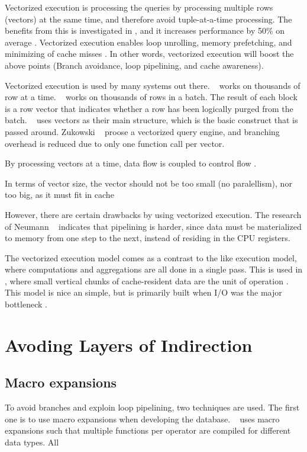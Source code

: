 Vectorized execution is processing the queries by processing multiple rows (vectors) at the same time, and therefore avoid tuple-at-a-time processing. The benefits from this is investigated in \cite{Abadi2008-dd}, and it increases performance by 50\% on average . Vectorized execution enables loop unrolling, memory prefetching, and minimizing of cache misses \cite{Larson2013-mc}. In other words, vectorized execution will boost the above points (Branch avoidance, loop pipelining, and cache awareness).

Vectorized execution is used by many systems out there. \ibm~\cite{Raman2013-em} works on thousands of row at a time. \mssql~\cite{Larson2013-mc} works on thousands of rows in a batch. The result of each block is a row vector that indicates whether a row has been logically purged from the batch. \monetx~\cite{Boncz2005-wj} uses vectors as their main structure, which is the basic construct that is passed around. Zukowski \ea~\cite{Zukowski2006-oz} proose a vectorized query engine, and branching overhead is reduced due to only one function call per vector.

By processing vectors at a time, data flow is coupled to control flow \cite{Stonebraker2005-qz, Lamb2012-kg}.

In terms of vector size, the vector should not be too small (no paralellism), nor too big, as it must fit in cache \cite{Boncz2005-wj}

However, there are certain drawbacks by using vectorized execution. The research of Neumann \ea~\cite{Neumann2011-uq} indicates that pipelining is harder, since data must be materialized to memory from one step to the next, instead of residing in the CPU registers.

The vectorized execution model comes as a contrast to the  like execution model, where computations and aggregations are all done in a single pass. This is used in \monetx, where small vertical chunks of cache-resident data are the unit of operation \cite{Boncz2005-wj}. This model is nice an simple, but is primarily built when I/O was the major bottleneck \cite{Neumann2011-uq}.

\section{Avoding Layers of Indirection}
\label{sec:Avoding Layers of Indirection}

\subsection{Macro expansions}
\label{sub:Macro expansions}
To avoid branches and exploin loop pipelining, two techniques are used. The first one is to use macro expansions when developing the database. \monetdb~\cite{Boncz2002-yj} uses macro expansions such that multiple functions per operator are compiled for different data types. All

